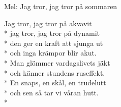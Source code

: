 \begin{SongText}
    \begin{SongInfo}
        Mel: Jag tror, jag tror på sommaren
    \end{SongInfo}
    \begin{SongVerse}
        Jag tror, jag tror på akvavit\\*%
        jag tror, jag tror på dynamit\\*%
        den ger en kraft att sjunga ut\\*%
        och inga krämpor blir akut.\\*%
        Man glömmer vardagslivets jäkt\\*%
        och känner stundens ruseffekt.\\*%
        En snaps, en skål, en trudelutt\\*%
        och sen så tar vi våran hutt.\\*%
    \end{SongVerse}
\end{SongText}
